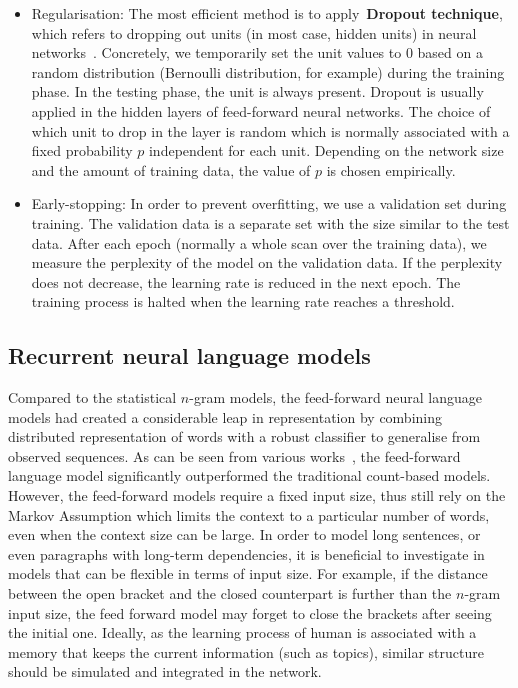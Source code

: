 \begin{itemize}
	\item Regularisation: The most efficient method is to apply~\textbf{Dropout technique}, which refers to dropping out units (in most case, hidden units) in neural networks~\cite{hinton2012dropout,srivastava2014dropout}. Concretely, we temporarily set the unit values to $0$ based on a random distribution (Bernoulli distribution, for example) during the training phase. In the testing phase, the unit is always present. Dropout is usually applied in the hidden layers of feed-forward neural networks. The choice of which unit to drop in the layer is random which is normally associated with a fixed probability $p$ independent for each unit. Depending on the network size and the amount of training data, the value of $p$ is chosen empirically.
	
	\item Early-stopping: In order to prevent overfitting, we use a validation set during training. The validation data is a separate set with the size similar to the test data. After each epoch (normally a whole scan over the training data), we measure the perplexity of the model on the validation data. If the perplexity does not decrease, the learning rate is reduced in the next epoch. The training process is halted when the learning rate reaches a threshold.
\end{itemize}
 
\subsection{Recurrent neural language models}

Compared to the statistical $n$-gram models, the feed-forward neural language models had created a considerable leap in representation by combining distributed representation of words with a robust classifier to generalise from observed sequences. As can be seen from various works~\cite{schwenk2007continuous,le2011structured}, the feed-forward language model significantly outperformed the traditional count-based models. However, the feed-forward models require a fixed input size, thus still rely on the Markov Assumption which limits the context to a particular number of words, even when the context size can be large. In order to model long sentences, or even paragraphs with long-term dependencies, it is beneficial to investigate in models that can be flexible in terms of input size. For example, if the distance between the open bracket and the closed counterpart is further than the $n$-gram input size, the feed forward model may forget to close the brackets after seeing the initial one. Ideally, as the learning process of human is associated with a memory that keeps the current information (such as topics), similar structure should be simulated and integrated in the network.

